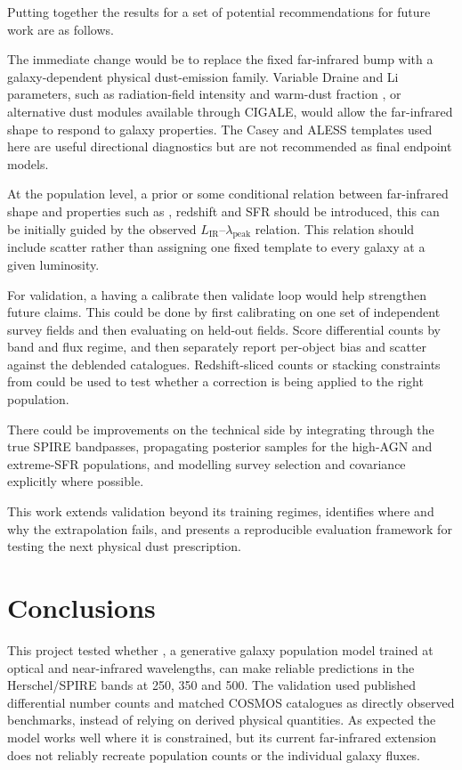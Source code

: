 \documentclass[12pt,a4paper]{article}
\begin{document}
Putting together the results for a set of potential recommendations for future \popcosmos{} work are as follows.

The immediate change would be to replace the fixed far-infrared bump with a
galaxy-dependent physical dust-emission family. Variable Draine and Li parameters, such
as radiation-field intensity and warm-dust fraction \citep{Draine_2007}, or alternative
dust modules available through CIGALE, would allow the far-infrared shape to respond to
galaxy properties. The Casey and ALESS templates used here are useful directional diagnostics but are not
recommended as final endpoint models.

At the population level, a prior or some conditional relation between far-infrared shape and
properties such as \LIR{}, redshift and SFR should be introduced, this can be initially guided by
the observed $L_\mathrm{IR}$--$\lambda_\mathrm{peak}$ relation. This relation should
include scatter rather than assigning one fixed template to every galaxy at a
given luminosity.

For validation, a having a calibrate then validate loop would help strengthen future claims.
This could be done by first calibrating on one set of independent survey fields and then evaluating on held-out fields.
Score differential counts by band and flux regime, and then separately report per-object bias
and scatter against the deblended catalogues. Redshift-sliced counts or stacking
constraints from \citet{B_thermin_2012} could be used to test whether a correction is being applied
to the right population.

There could be improvements on the technical side by integrating through the true SPIRE bandpasses,
propagating posterior samples for the high-AGN and extreme-SFR populations, and
modelling survey selection and covariance explicitly where possible.

This work extends \popcosmos{} validation beyond its training regimes, identifies
where and why the extrapolation fails, and presents a reproducible
evaluation framework for testing the next physical dust prescription.

\section{Conclusions}
\label{sec:conclusions}

This project tested whether \popcosmos{}, a generative galaxy population model
trained at optical and near-infrared wavelengths, can make reliable predictions in the
Herschel/SPIRE bands at 250, 350 and 500{\um}. The validation used
published differential number counts and matched COSMOS catalogues as directly observed
benchmarks, instead of relying on derived physical quantities. As expected the model works well where
it is constrained, but its current far-infrared extension does not reliably recreate
population counts or the individual galaxy fluxes.
\end{document}
